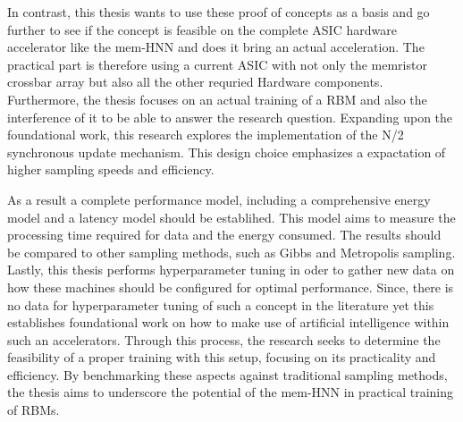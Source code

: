In contrast, this thesis wants to use these proof of concepts as a basis and go further to see if the concept
is feasible on the complete \ac{ASIC} hardware accelerator like the \ac{mem-HNN} and does it bring an actual acceleration.
The practical part is therefore using a current \ac{ASIC} with not only the memristor crossbar array but also all the other requried Hardware components.
Furthermore, the thesis focuses on an actual training of a \ac{RBM} and also the interference of it to be able to answer the research question.
Expanding upon the foundational work, this research explores the implementation of the N/2 synchronous update mechanism.
This design choice emphasizes a expactation of higher sampling speeds and efficiency.

As a result a complete performance model, including a comprehensive energy model and a latency model should be establihed.
This model aims to measure the processing time required for data and the energy consumed.
The results should be compared to other sampling methods, such as Gibbs and Metropolis sampling.
Lastly, this thesis performs hyperparameter tuning in oder to gather new data on how these machines should be configured for optimal performance.
Since, there is no data for hyperparameter tuning of such a concept in the literature yet this establishes foundational work on how to make use of artificial intelligence within such an accelerators.
Through this process, the research seeks to determine the feasibility of a proper training with this setup, focusing on its practicality and efficiency.
By benchmarking these aspects against traditional sampling methods, the thesis aims to underscore the potential of the \ac{mem-HNN} 
in practical training of \ac{RBM}s.




